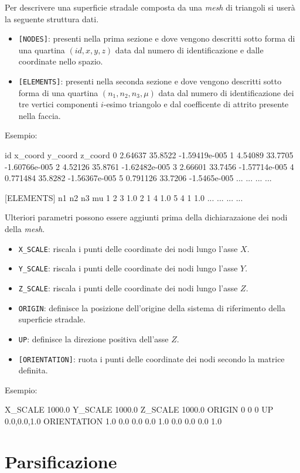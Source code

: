 Per descrivere una superficie stradale composta da una \textit{mesh} di triangoli si userà la seguente struttura dati.
\begin{itemize}
	\item \texttt{[NODES]}: presenti nella prima sezione e dove vengono descritti sotto forma di una quartina $(id,x,y,z)$ data dal numero di identificazione e dalle coordinate nello spazio.
	\item \texttt{[ELEMENTS]}: presenti nella seconda sezione e dove vengono descritti sotto forma di una quartina $(n_1,n_2,n_3,\mu)$ data dal numero di identificazione dei tre vertici componenti $i$-esimo triangolo e dal coefficente di attrito presente nella faccia.
\end{itemize}
Esempio:
\begin{pseudoc}
	[NODES]
	{ id x_coord y_coord z_coord }
	0 2.64637 35.8522 -1.59419e-005 
	1 4.54089 33.7705 -1.60766e-005 
	2 4.52126 35.8761 -1.62482e-005 
	3 2.66601 33.7456 -1.57714e-005 
	4 0.771484 35.8282 -1.56367e-005 
	5 0.791126 33.7206 -1.5465e-005
	... ... ... ...
	
	[ELEMENTS]
	{ n1 n2 n3 mu }
	1 2 3 1.0 
	2 1 4 1.0 
	5 4 1 1.0 
	... ... ... ...
\end{pseudoc}

Ulteriori parametri possono essere aggiunti prima della dichiarazaione dei nodi della \textit{mesh}.
\begin{itemize}
	\item \texttt{X\_SCALE}: riscala i punti delle coordinate dei nodi lungo l'asse $X$.
	\item \texttt{Y\_SCALE}: riscala i punti delle coordinate dei nodi lungo l'asse $Y$.
	\item \texttt{Z\_SCALE}: riscala i punti delle coordinate dei nodi lungo l'asse $Z$.
	\item \texttt{ORIGIN}: definisce la posizione dell'origine della sistema di riferimento della superficie stradale.
	\item \texttt{UP}: definisce la direzione positiva dell'asse $Z$.
	\item \texttt{[ORIENTATION]}: ruota i punti delle coordinate dei nodi secondo la matrice definita.
\end{itemize}
Esempio:
\begin{pseudoc}
	X_SCALE
	1000.0
	Y_SCALE
	1000.0
	Z_SCALE
	1000.0
	ORIGIN
	0 0 0
	UP
	0.0,0.0,1.0
	ORIENTATION
	1.0  0.0  0.0
	0.0  1.0  0.0
	0.0  0.0  1.0
\end{pseudoc}
%
\section{Parsificazione}
%
